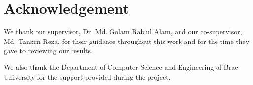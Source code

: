 \section*{Acknowledgement}

We thank our supervisor, Dr. Md. Golam Rabiul Alam, and our co-supervisor,
Md. Tanzim Reza, for their guidance throughout this work and for the time they
gave to reviewing our results.


We also thank the Department of Computer Science and Engineering of Brac
University for the support provided during the project.

\pagebreak
